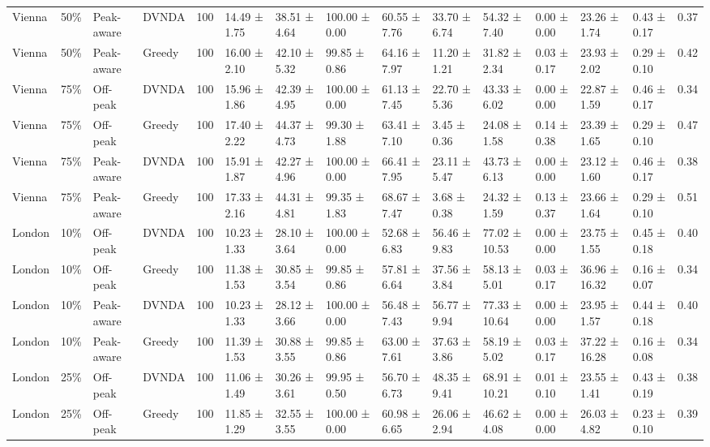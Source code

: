 \begin{tabular}{lllllllllllllll}
Vienna & 50\% & Peak-aware & DVNDA & 100 & 14.49 ± 1.75 & 38.51 ± 4.64 & 100.00 ± 0.00 & 60.55 ± 7.76 & 33.70 ± 6.74 & 54.32 ± 7.40 & 0.00 ± 0.00 & 23.26 ± 1.74 & 0.43 ± 0.17 & 0.37 \\
Vienna & 50\% & Peak-aware & Greedy & 100 & 16.00 ± 2.10 & 42.10 ± 5.32 & 99.85 ± 0.86 & 64.16 ± 7.97 & 11.20 ± 1.21 & 31.82 ± 2.34 & 0.03 ± 0.17 & 23.93 ± 2.02 & 0.29 ± 0.10 & 0.42 \\
Vienna & 75\% & Off-peak & DVNDA & 100 & 15.96 ± 1.86 & 42.39 ± 4.95 & 100.00 ± 0.00 & 61.13 ± 7.45 & 22.70 ± 5.36 & 43.33 ± 6.02 & 0.00 ± 0.00 & 22.87 ± 1.59 & 0.46 ± 0.17 & 0.34 \\
Vienna & 75\% & Off-peak & Greedy & 100 & 17.40 ± 2.22 & 44.37 ± 4.73 & 99.30 ± 1.88 & 63.41 ± 7.10 & 3.45 ± 0.36 & 24.08 ± 1.58 & 0.14 ± 0.38 & 23.39 ± 1.65 & 0.29 ± 0.10 & 0.47 \\
Vienna & 75\% & Peak-aware & DVNDA & 100 & 15.91 ± 1.87 & 42.27 ± 4.96 & 100.00 ± 0.00 & 66.41 ± 7.95 & 23.11 ± 5.47 & 43.73 ± 6.13 & 0.00 ± 0.00 & 23.12 ± 1.60 & 0.46 ± 0.17 & 0.38 \\
Vienna & 75\% & Peak-aware & Greedy & 100 & 17.33 ± 2.16 & 44.31 ± 4.81 & 99.35 ± 1.83 & 68.67 ± 7.47 & 3.68 ± 0.38 & 24.32 ± 1.59 & 0.13 ± 0.37 & 23.66 ± 1.64 & 0.29 ± 0.10 & 0.51 \\
London & 10\% & Off-peak & DVNDA & 100 & 10.23 ± 1.33 & 28.10 ± 3.64 & 100.00 ± 0.00 & 52.68 ± 6.83 & 56.46 ± 9.83 & 77.02 ± 10.53 & 0.00 ± 0.00 & 23.75 ± 1.55 & 0.45 ± 0.18 & 0.40 \\
London & 10\% & Off-peak & Greedy & 100 & 11.38 ± 1.53 & 30.85 ± 3.54 & 99.85 ± 0.86 & 57.81 ± 6.64 & 37.56 ± 3.84 & 58.13 ± 5.01 & 0.03 ± 0.17 & 36.96 ± 16.32 & 0.16 ± 0.07 & 0.34 \\
London & 10\% & Peak-aware & DVNDA & 100 & 10.23 ± 1.33 & 28.12 ± 3.66 & 100.00 ± 0.00 & 56.48 ± 7.43 & 56.77 ± 9.94 & 77.33 ± 10.64 & 0.00 ± 0.00 & 23.95 ± 1.57 & 0.44 ± 0.18 & 0.40 \\
London & 10\% & Peak-aware & Greedy & 100 & 11.39 ± 1.53 & 30.88 ± 3.55 & 99.85 ± 0.86 & 63.00 ± 7.61 & 37.63 ± 3.86 & 58.19 ± 5.02 & 0.03 ± 0.17 & 37.22 ± 16.28 & 0.16 ± 0.08 & 0.34 \\
London & 25\% & Off-peak & DVNDA & 100 & 11.06 ± 1.49 & 30.26 ± 3.61 & 99.95 ± 0.50 & 56.70 ± 6.73 & 48.35 ± 9.41 & 68.91 ± 10.21 & 0.01 ± 0.10 & 23.55 ± 1.41 & 0.43 ± 0.19 & 0.38 \\
London & 25\% & Off-peak & Greedy & 100 & 11.85 ± 1.29 & 32.55 ± 3.55 & 100.00 ± 0.00 & 60.98 ± 6.65 & 26.06 ± 2.94 & 46.62 ± 4.08 & 0.00 ± 0.00 & 26.03 ± 4.82 & 0.23 ± 0.10 & 0.39 \\

\end{tabular}
